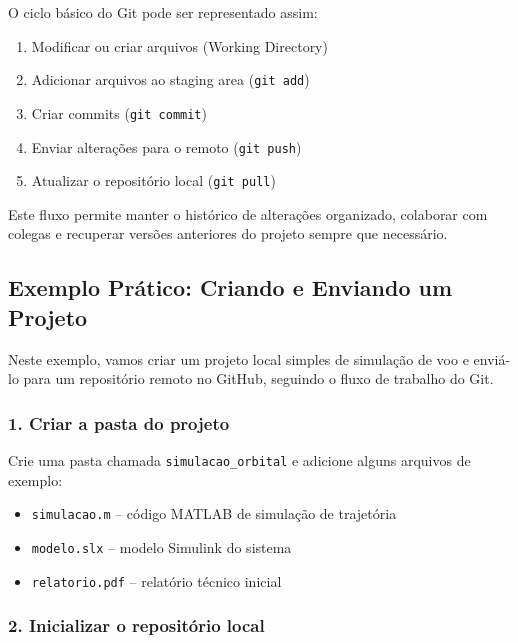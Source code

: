 O ciclo básico do Git pode ser representado assim:

\begin{enumerate}
    \item Modificar ou criar arquivos (Working Directory)
    \item Adicionar arquivos ao staging area (\texttt{git add})
    \item Criar commits (\texttt{git commit})
    \item Enviar alterações para o remoto (\texttt{git push})
    \item Atualizar o repositório local (\texttt{git pull})
\end{enumerate}

Este fluxo permite manter o histórico de alterações organizado, colaborar com colegas e recuperar versões anteriores do projeto sempre que necessário.



\subsection{Exemplo Prático: Criando e Enviando um Projeto}

Neste exemplo, vamos criar um projeto local simples de simulação de voo e enviá-lo para um repositório remoto no GitHub, seguindo o fluxo de trabalho do Git.

\subsubsection*{1. Criar a pasta do projeto}

Crie uma pasta chamada \texttt{simulacao\_orbital} e adicione alguns arquivos de exemplo:

\begin{itemize}
    \item \texttt{simulacao.m} – código MATLAB de simulação de trajetória
    \item \texttt{modelo.slx} – modelo Simulink do sistema
    \item \texttt{relatorio.pdf} – relatório técnico inicial
\end{itemize}

\subsubsection*{2. Inicializar o repositório local}

